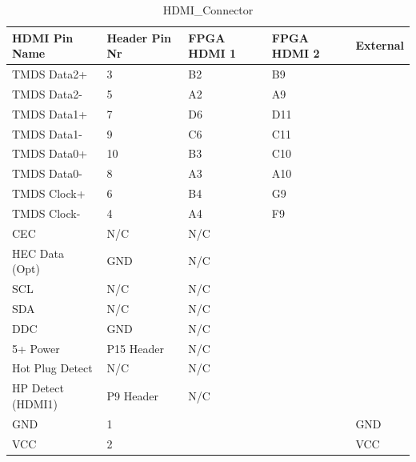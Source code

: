 \begin{table}[]
    \centering
    \label{HDMI Connector}
    \begin{tabular}{lllll}
        HDMI Pin Name            & Header Pin Nr & FPGA HDMI 1 & FPGA HDMI 2 & External \\
        \hline
        TMDS Data2+              & 3             & B2              & B9              &          \\
        TMDS Data2-              & 5             & A2              & A9              &          \\
        TMDS Data1+              & 7             & D6              & D11             &          \\
        TMDS Data1-              & 9             & C6              & C11             &          \\
        TMDS Data0+              & 10            & B3              & C10             &          \\
        TMDS Data0-              & 8             & A3              & A10             &          \\
        TMDS Clock+              & 6             & B4              & G9              &          \\
        TMDS Clock-              & 4             & A4              & F9              &          \\
        CEC                      & N/C           & N/C             &                 &          \\
        HEC Data (Opt)           & GND           & N/C             &                 &          \\
        SCL                      & N/C           & N/C             &                 &          \\
        SDA                      & N/C           & N/C             &                 &          \\
        DDC                      & GND           & N/C             &                 &          \\
        5+ Power                 & P15 Header    & N/C             &                 &          \\
        Hot Plug Detect          & N/C           & N/C             &                 &          \\
        HP Detect (HDMI1) & P9 Header     & N/C             &                 &          \\
        GND & 1             &                 &                 & GND      \\
        VCC & 2             &                 &                 & VCC      \\
    \end{tabular}
    \caption{HDMI_Connector}
\end{table}

